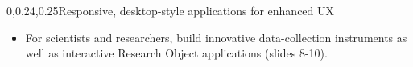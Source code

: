 \begin{frame}{}
{\begin{center}
\begin{minipage}{.9\textwidth}
{\begin{minipage}{\textwidth}
\begin{lightquadblockc}{0,0.24,0.25}{Responsive, desktop-style applications for enhanced UX}
\begin{itemize}
\item  For scientists and researchers, 
build innovative data-collection instruments 
as well as interactive Research Object applications 
(slides 8-10).\vspace{1.5em}
\end{itemize} 
\end{lightquadblockc}
\end{minipage}}

\end{minipage}
\end{center}
}

\end{frame}
